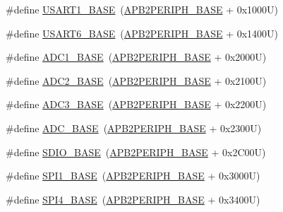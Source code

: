 \begin{DoxyCompactItemize}
\item 
\#define \hyperlink{group___peripheral__memory__map_ga86162ab3f740db9026c1320d46938b4d}{U\+S\+A\+R\+T1\+\_\+\+B\+A\+SE}~(\hyperlink{group___peripheral__memory__map_ga25b99d6065f1c8f751e78f43ade652cb}{A\+P\+B2\+P\+E\+R\+I\+P\+H\+\_\+\+B\+A\+SE} + 0x1000\+U)
\item 
\#define \hyperlink{group___peripheral__memory__map_gade4d3907fd0387ee832f426f52d568bb}{U\+S\+A\+R\+T6\+\_\+\+B\+A\+SE}~(\hyperlink{group___peripheral__memory__map_ga25b99d6065f1c8f751e78f43ade652cb}{A\+P\+B2\+P\+E\+R\+I\+P\+H\+\_\+\+B\+A\+SE} + 0x1400\+U)
\item 
\#define \hyperlink{group___peripheral__memory__map_ga695c9a2f892363a1c942405c8d351b91}{A\+D\+C1\+\_\+\+B\+A\+SE}~(\hyperlink{group___peripheral__memory__map_ga25b99d6065f1c8f751e78f43ade652cb}{A\+P\+B2\+P\+E\+R\+I\+P\+H\+\_\+\+B\+A\+SE} + 0x2000\+U)
\item 
\#define \hyperlink{group___peripheral__memory__map_ga6544abc57f9759f610eee09a02442ae6}{A\+D\+C2\+\_\+\+B\+A\+SE}~(\hyperlink{group___peripheral__memory__map_ga25b99d6065f1c8f751e78f43ade652cb}{A\+P\+B2\+P\+E\+R\+I\+P\+H\+\_\+\+B\+A\+SE} + 0x2100\+U)
\item 
\#define \hyperlink{group___peripheral__memory__map_gaca766f86c8e0b00a8e2b0224dcbb4c82}{A\+D\+C3\+\_\+\+B\+A\+SE}~(\hyperlink{group___peripheral__memory__map_ga25b99d6065f1c8f751e78f43ade652cb}{A\+P\+B2\+P\+E\+R\+I\+P\+H\+\_\+\+B\+A\+SE} + 0x2200\+U)
\item 
\#define \hyperlink{group___peripheral__memory__map_gad06cb9e5985bd216a376f26f22303cd6}{A\+D\+C\+\_\+\+B\+A\+SE}~(\hyperlink{group___peripheral__memory__map_ga25b99d6065f1c8f751e78f43ade652cb}{A\+P\+B2\+P\+E\+R\+I\+P\+H\+\_\+\+B\+A\+SE} + 0x2300\+U)
\item 
\#define \hyperlink{group___peripheral__memory__map_ga95dd0abbc6767893b4b02935fa846f52}{S\+D\+I\+O\+\_\+\+B\+A\+SE}~(\hyperlink{group___peripheral__memory__map_ga25b99d6065f1c8f751e78f43ade652cb}{A\+P\+B2\+P\+E\+R\+I\+P\+H\+\_\+\+B\+A\+SE} + 0x2\+C00\+U)
\item 
\#define \hyperlink{group___peripheral__memory__map_ga50cd8b47929f18b05efbd0f41253bf8d}{S\+P\+I1\+\_\+\+B\+A\+SE}~(\hyperlink{group___peripheral__memory__map_ga25b99d6065f1c8f751e78f43ade652cb}{A\+P\+B2\+P\+E\+R\+I\+P\+H\+\_\+\+B\+A\+SE} + 0x3000\+U)
\item 
\#define \hyperlink{group___peripheral__memory__map_gac5cfaedf263cee1e79554665f921c708}{S\+P\+I4\+\_\+\+B\+A\+SE}~(\hyperlink{group___peripheral__memory__map_ga25b99d6065f1c8f751e78f43ade652cb}{A\+P\+B2\+P\+E\+R\+I\+P\+H\+\_\+\+B\+A\+SE} + 0x3400\+U)

\end{DoxyCompactItemize}
